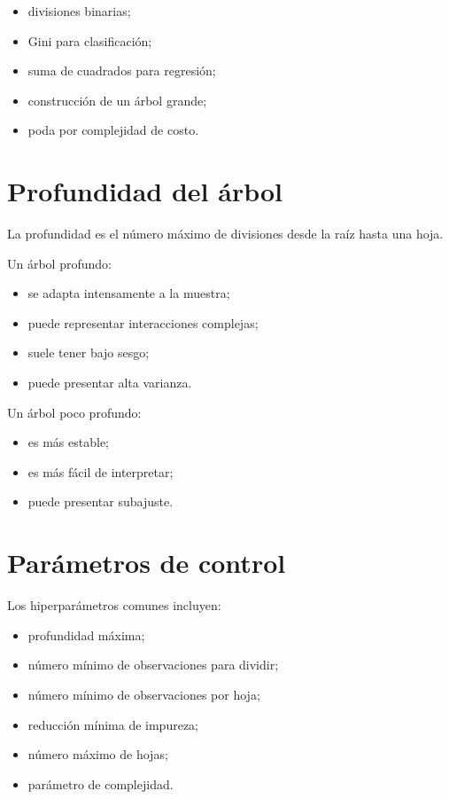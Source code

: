 \documentclass[
  spanish,
  10.5pt,
  letterpaper,
  DIV=11,
  numbers=noendperiod,
  oneside,
  open=any]{scrreprt}
\providecommand{\tightlist}{%
  \setlength{\itemsep}{0pt}\setlength{\parskip}{0pt}}
\theoremstyle{definition}
\theoremstyle{definition}
\theoremstyle{plain}
\theoremstyle{remark}
\begin{document}
\begin{itemize}
\tightlist
\item
  divisiones binarias;
\item
  Gini para clasificación;
\item
  suma de cuadrados para regresión;
\item
  construcción de un árbol grande;
\item
  poda por complejidad de costo.
\end{itemize}

\section*{Profundidad del árbol}\label{profundidad-del-uxe1rbol}


La profundidad es el número máximo de divisiones desde la raíz hasta una
hoja.

Un árbol profundo:

\begin{itemize}
\tightlist
\item
  se adapta intensamente a la muestra;
\item
  puede representar interacciones complejas;
\item
  suele tener bajo sesgo;
\item
  puede presentar alta varianza.
\end{itemize}

Un árbol poco profundo:

\begin{itemize}
\tightlist
\item
  es más estable;
\item
  es más fácil de interpretar;
\item
  puede presentar subajuste.
\end{itemize}

\section*{Parámetros de control}\label{paruxe1metros-de-control}


Los hiperparámetros comunes incluyen:

\begin{itemize}
\tightlist
\item
  profundidad máxima;
\item
  número mínimo de observaciones para dividir;
\item
  número mínimo de observaciones por hoja;
\item
  reducción mínima de impureza;
\item
  número máximo de hojas;
\item
  parámetro de complejidad.
\end{itemize}
\end{document}

